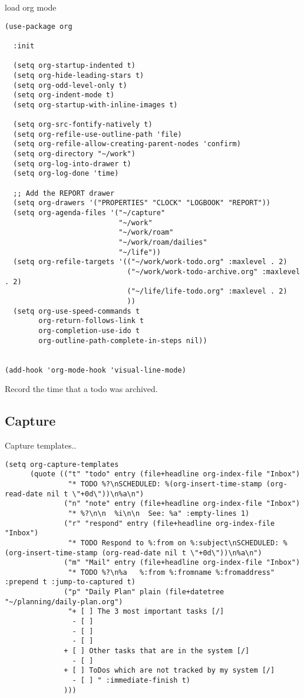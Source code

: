 \documentclass[12pt]{article}
\begin{document}
load org mode

\begin{verbatim}
(use-package org

  :init

  (setq org-startup-indented t)
  (setq org-hide-leading-stars t)
  (setq org-odd-level-only t)
  (setq org-indent-mode t)
  (setq org-startup-with-inline-images t)

  (setq org-src-fontify-natively t)
  (setq org-refile-use-outline-path 'file)
  (setq org-refile-allow-creating-parent-nodes 'confirm)
  (setq org-directory "~/work")
  (setq org-log-into-drawer t)
  (setq org-log-done 'time)

  ;; Add the REPORT drawer
  (setq org-drawers '("PROPERTIES" "CLOCK" "LOGBOOK" "REPORT"))
  (setq org-agenda-files '("~/capture"
                           "~/work"
                           "~/work/roam"
                           "~/work/roam/dailies"
                           "~/life"))
  (setq org-refile-targets '(("~/work/work-todo.org" :maxlevel . 2)
                             ("~/work/work-todo-archive.org" :maxlevel . 2)
                             ("~/life/life-todo.org" :maxlevel . 2)
                             ))
  (setq org-use-speed-commands t
        org-return-follows-link t
        org-completion-use-ido t
        org-outline-path-complete-in-steps nil))


(add-hook 'org-mode-hook 'visual-line-mode)
\end{verbatim}


Record the time that a todo was archived.

\subsection{Capture}
\label{sec:orgdbd0244}
Capture templates..
\begin{verbatim}
(setq org-capture-templates
      (quote (("t" "todo" entry (file+headline org-index-file "Inbox")
               "* TODO %?\nSCHEDULED: %(org-insert-time-stamp (org-read-date nil t \"+0d\"))\n%a\n")
              ("n" "note" entry (file+headline org-index-file "Inbox")
               "* %?\n\n  %i\n\n  See: %a" :empty-lines 1)
              ("r" "respond" entry (file+headline org-index-file "Inbox")
               "* TODO Respond to %:from on %:subject\nSCHEDULED: %(org-insert-time-stamp (org-read-date nil t \"+0d\"))\n%a\n")
              ("m" "Mail" entry (file+headline org-index-file "Inbox")
               "* TODO %?\n%a   %:from %:fromname %:fromaddress" :prepend t :jump-to-captured t)
              ("p" "Daily Plan" plain (file+datetree "~/planning/daily-plan.org")
               "+ [ ] The 3 most important tasks [/]
                - [ ]
                - [ ]
                - [ ]
              + [ ] Other tasks that are in the system [/]
                - [ ]
              + [ ] ToDos which are not tracked by my system [/]
                - [ ] " :immediate-finish t)
              )))
\end{verbatim}
\end{document}
